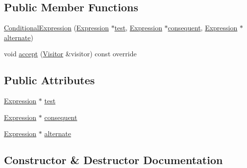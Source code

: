 \subsection*{Public Member Functions}
\begin{DoxyCompactItemize}
\item 
\hyperlink{structast_1_1_conditional_expression_ae1d0b0d1bdff64be72a8c506a7ed05f2}{Conditional\+Expression} (\hyperlink{structast_1_1_expression}{Expression} $\ast$\hyperlink{structast_1_1_conditional_expression_ae45a4e413943196c548657c3259dafa5}{test}, \hyperlink{structast_1_1_expression}{Expression} $\ast$\hyperlink{structast_1_1_conditional_expression_a156bf0acbb9f51a660cd8270fd5fceea}{consequent}, \hyperlink{structast_1_1_expression}{Expression} $\ast$\hyperlink{structast_1_1_conditional_expression_a26b4ef799945f3670e759c4d396b3fb2}{alternate})
\item 
void \hyperlink{structast_1_1_conditional_expression_a97fb13e04440b153cc6c1ded95b35e40}{accept} (\hyperlink{structast_1_1_visitor}{Visitor} \&visitor) const override
\end{DoxyCompactItemize}
\subsection*{Public Attributes}
\begin{DoxyCompactItemize}
\item 
\hyperlink{structast_1_1_expression}{Expression} $\ast$ \hyperlink{structast_1_1_conditional_expression_ae45a4e413943196c548657c3259dafa5}{test}
\item 
\hyperlink{structast_1_1_expression}{Expression} $\ast$ \hyperlink{structast_1_1_conditional_expression_a156bf0acbb9f51a660cd8270fd5fceea}{consequent}
\item 
\hyperlink{structast_1_1_expression}{Expression} $\ast$ \hyperlink{structast_1_1_conditional_expression_a26b4ef799945f3670e759c4d396b3fb2}{alternate}
\end{DoxyCompactItemize}


\subsection{Constructor \& Destructor Documentation}
\mbox{\label{structast_1_1_conditional_expression_ae1d0b0d1bdff64be72a8c506a7ed05f2}} 
